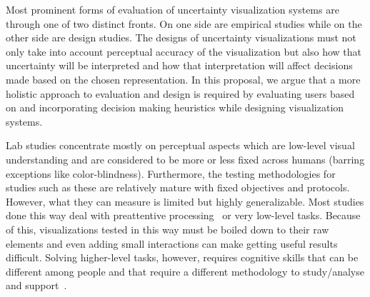 
Most prominent forms of evaluation of uncertainty visualization systems 
are through one of two distinct fronts.
On one side are empirical studies while on the other side are design studies.
The designs of uncertainty visualizations must not only take into account 
perceptual accuracy of the visualization but also how that uncertainty will
be interpreted and how that interpretation will affect decisions made based
on the chosen representation.  In this proposal,
we argue that a more holistic approach to evaluation and design is required
by evaluating users based on and incorporating decision making heuristics
while designing visualization systems.

Lab studies concentrate mostly on perceptual aspects which are low-level visual
understanding and are considered to be more or less fixed across humans
(barring exceptions like color-blindness). Furthermore, the testing
methodologies for studies such as these are relatively mature with fixed
objectives and protocols. However, what they can measure is limited but highly
generalizable. Most studies done this way deal with preattentive 
processing~\citep{McGrath:1995} or
very low-level tasks. Because of this, visualizations tested in this way must be
boiled down to their raw elements and even adding small interactions can make
getting useful results difficult.  
Solving higher-level tasks, however, requires cognitive 
skills that can be different among people and that require a different 
methodology to study/analyse and support~\citep{Frensch:2005}.

